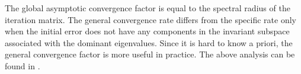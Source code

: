The global asymptotic convergence factor is equal to the spectral radius of the iteration matrix. 
The general convergence rate differs from the specific rate only when the initial error does not have any components in the invariant subspace associated with the dominant eigenvalues. Since it is hard to know a priori, the general convergence factor is more useful in practice. The above analysis can be found in \cite{doi:10.1137/1.9780898718003}.

